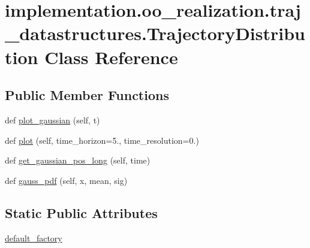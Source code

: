 \hypertarget{classimplementation_1_1oo__realization_1_1traj__datastructures_1_1_trajectory_distribution}{}\section{implementation.\+oo\+\_\+realization.\+traj\+\_\+datastructures.\+Trajectory\+Distribution Class Reference}
\label{classimplementation_1_1oo__realization_1_1traj__datastructures_1_1_trajectory_distribution}
\subsection*{Public Member Functions}
\begin{DoxyCompactItemize}
\item 
def \hyperlink{classimplementation_1_1oo__realization_1_1traj__datastructures_1_1_trajectory_distribution_a64d5a3d5634dcce023833149f5c59f30}{plot\+\_\+gaussian} (self, t)
\item 
def \hyperlink{classimplementation_1_1oo__realization_1_1traj__datastructures_1_1_trajectory_distribution_a76b7f7c4f2dfb0ad7b24a23300586e87}{plot} (self, time\+\_\+horizon=5., time\+\_\+resolution=0.)
\item 
def \hyperlink{classimplementation_1_1oo__realization_1_1traj__datastructures_1_1_trajectory_distribution_afa37935dd4f195b99521ae9793153faf}{get\+\_\+gaussian\+\_\+pos\+\_\+long} (self, time)
\item 
def \hyperlink{classimplementation_1_1oo__realization_1_1traj__datastructures_1_1_trajectory_distribution_afb8a88f144922a06b44e6f7dbee8e03f}{gauss\+\_\+pdf} (self, x, mean, sig)
\end{DoxyCompactItemize}
\subsection*{Static Public Attributes}
\begin{DoxyCompactItemize}
\item 
\hyperlink{classimplementation_1_1oo__realization_1_1traj__datastructures_1_1_trajectory_distribution_a389b3c601c09a755a8796df39c19be21}{default\+\_\+factory}
\end{DoxyCompactItemize}



